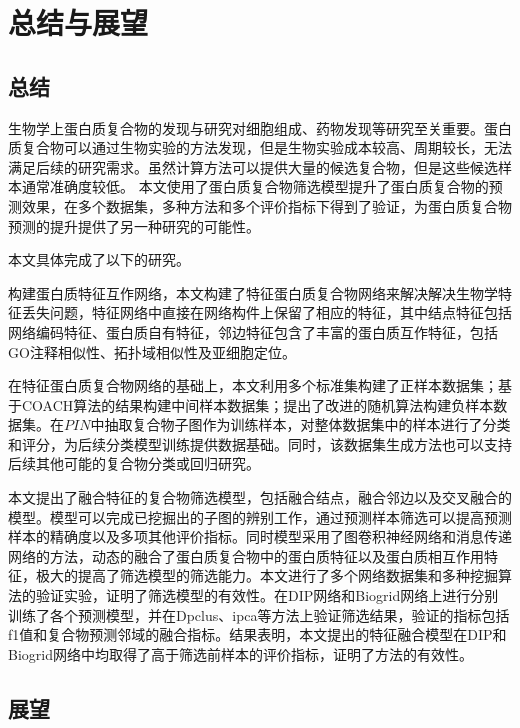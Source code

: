 \chapter{总结与展望}
\label{chapter:SummaryAndForward}

\section{总结}
\label{section:allsummary}

生物学上蛋白质复合物的发现与研究对细胞组成、药物发现等研究至关重要。蛋白质复合物可以通过生物实验的方法发现，但是生物实验成本较高、周期较长，无法满足后续的研究需求。虽然计算方法可以提供大量的候选复合物，但是这些候选样本通常准确度较低。
本文使用了蛋白质复合物筛选模型提升了蛋白质复合物的预测效果，在多个数据集，多种方法和多个评价指标下得到了验证，为蛋白质复合物预测的提升提供了另一种研究的可能性。

本文具体完成了以下的研究。

构建蛋白质特征互作网络，本文构建了特征蛋白质复合物网络来解决解决生物学特征丢失问题，特征网络中直接在网络构件上保留了相应的特征，其中结点特征包括网络编码特征、蛋白质自有特征，邻边特征包含了丰富的蛋白质互作特征，包括GO注释相似性、拓扑域相似性及亚细胞定位。

在特征蛋白质复合物网络的基础上，本文利用多个标准集构建了正样本数据集；基于COACH算法的结果构建中间样本数据集；提出了改进的随机算法构建负样本数据集。在$PIN$中抽取复合物子图作为训练样本，对整体数据集中的样本进行了分类和评分，为后续分类模型训练提供数据基础。同时，该数据集生成方法也可以支持后续其他可能的复合物分类或回归研究。

本文提出了融合特征的复合物筛选模型，包括融合结点，融合邻边以及交叉融合的模型。模型可以完成已挖掘出的子图的辨别工作，通过预测样本筛选可以提高预测样本的精确度以及多项其他评价指标。同时模型采用了图卷积神经网络和消息传递网络的方法，动态的融合了蛋白质复合物中的蛋白质特征以及蛋白质相互作用特征，极大的提高了筛选模型的筛选能力。本文进行了多个网络数据集和多种挖掘算法的验证实验，证明了筛选模型的有效性。在DIP网络和Biogrid网络上进行分别训练了各个预测模型，并在Dpclus、ipca等方法上验证筛选结果，验证的指标包括f1值和复合物预测邻域的融合指标。结果表明，本文提出的特征融合模型在DIP和Biogrid网络中均取得了高于筛选前样本的评价指标，证明了方法的有效性。

\section{展望}
\label{section:forward}

